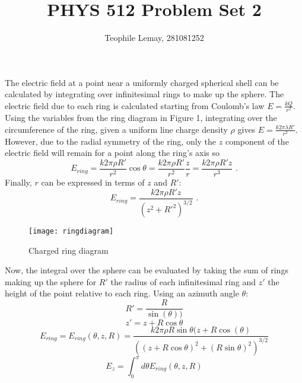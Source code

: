 \documentclass{article}
\title{PHYS 512 Problem Set 2}
\author{Teophile Lemay, 281081252}
\date{}
\newcommand{\<}[1]{\left\langle #1 \right\rangle }
\begin{document}
	\maketitle
	
\section{}
The electric field at a point near a uniformly charged spherical shell can be calculated by integrating over infinitesimal rings to make up the sphere. The electric field due to each ring is calculated starting from Coulomb's law $E = \frac{kQ}{r^2}$. Using the variables from the ring diagram in Figure 1, integrating over the circumference of the ring, given a uniform line charge density $\rho$ gives $E = \frac{k2\pi \lambda R'}{r^2}$. However, due to the radial symmetry of the ring, only the $z$ component of the electric field will remain for a point along the ring's axis so
\[E_{ring} = \frac{k2\pi\rho R'}{r^2} \cos{\theta} = \frac{k2\pi\rho R'}{r^2}\frac{z}{r} = \frac{k2\pi\rho R'z}{r^3}\text{ .}\]
Finally, $r$ can be expressed in terms of $z$ and $R'$:
\[E_{ring} = \frac{k2\pi\rho R'z}{\left(z^2 + R'^2\right)^{3/2}} \text{ .}\]
\begin{figure}[h]
	\caption{Charged ring diagram}
	\centering
	\texttt{[image: ringdiagram]}
\end{figure}
Now, the integral over the sphere can be evaluated by taking the sum of rings making up the sphere for $R'$ the radius of each infinitesimal ring and $z'$ the height of the point relative to each ring. Using an azimuth angle $\theta$:
\[R' = \frac{R}{\sin(\theta))} \]
\[z' = z + R\cos\theta\]
\[E_{ring} = E_{ring}(\theta, z, R) = \frac{k2\pi\rho R\sin{\theta}(z+R\cos(\theta)}{\left((z+R\cos{\theta})^2 + (R\sin{\theta})^2\right)^{3/2}}\]
\[E_z = \int_{0}^{\pi}  d\theta E_{ring}(\theta, z, R)\]
\end{document}
